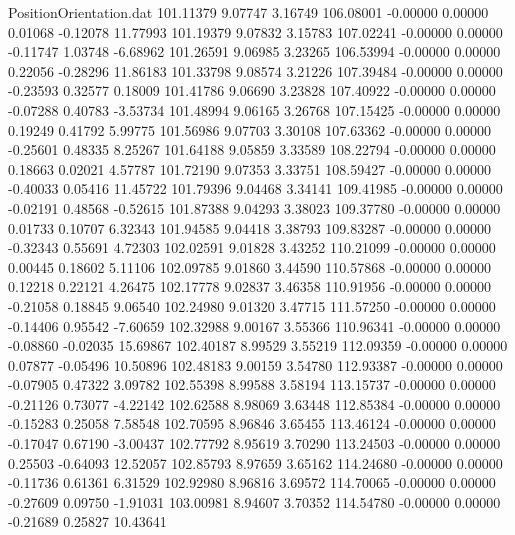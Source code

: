 \begin{filecontents}{PositionOrientation.dat}
 101.11379    9.07747    3.16749   106.08001   -0.00000    0.00000    0.01068   -0.12078   11.77993
 101.19379    9.07832    3.15783   107.02241   -0.00000    0.00000   -0.11747    1.03748   -6.68962
 101.26591    9.06985    3.23265   106.53994   -0.00000    0.00000    0.22056   -0.28296   11.86183
 101.33798    9.08574    3.21226   107.39484   -0.00000    0.00000   -0.23593    0.32577    0.18009
 101.41786    9.06690    3.23828   107.40922   -0.00000    0.00000   -0.07288    0.40783   -3.53734
 101.48994    9.06165    3.26768   107.15425   -0.00000    0.00000    0.19249    0.41792    5.99775
 101.56986    9.07703    3.30108   107.63362   -0.00000    0.00000   -0.25601    0.48335    8.25267
 101.64188    9.05859    3.33589   108.22794   -0.00000    0.00000    0.18663    0.02021    4.57787
 101.72190    9.07353    3.33751   108.59427   -0.00000    0.00000   -0.40033    0.05416   11.45722
 101.79396    9.04468    3.34141   109.41985   -0.00000    0.00000   -0.02191    0.48568   -0.52615
 101.87388    9.04293    3.38023   109.37780   -0.00000    0.00000    0.01733    0.10707    6.32343
 101.94585    9.04418    3.38793   109.83287   -0.00000    0.00000   -0.32343    0.55691    4.72303
 102.02591    9.01828    3.43252   110.21099   -0.00000    0.00000    0.00445    0.18602    5.11106
 102.09785    9.01860    3.44590   110.57868   -0.00000    0.00000    0.12218    0.22121    4.26475
 102.17778    9.02837    3.46358   110.91956   -0.00000    0.00000   -0.21058    0.18845    9.06540
 102.24980    9.01320    3.47715   111.57250   -0.00000    0.00000   -0.14406    0.95542   -7.60659
 102.32988    9.00167    3.55366   110.96341   -0.00000    0.00000   -0.08860   -0.02035   15.69867
 102.40187    8.99529    3.55219   112.09359   -0.00000    0.00000    0.07877   -0.05496   10.50896
 102.48183    9.00159    3.54780   112.93387   -0.00000    0.00000   -0.07905    0.47322    3.09782
 102.55398    8.99588    3.58194   113.15737   -0.00000    0.00000   -0.21126    0.73077   -4.22142
 102.62588    8.98069    3.63448   112.85384   -0.00000    0.00000   -0.15283    0.25058    7.58548
 102.70595    8.96846    3.65455   113.46124   -0.00000    0.00000   -0.17047    0.67190   -3.00437
 102.77792    8.95619    3.70290   113.24503   -0.00000    0.00000    0.25503   -0.64093   12.52057
 102.85793    8.97659    3.65162   114.24680   -0.00000    0.00000   -0.11736    0.61361    6.31529
 102.92980    8.96816    3.69572   114.70065   -0.00000    0.00000   -0.27609    0.09750   -1.91031
 103.00981    8.94607    3.70352   114.54780   -0.00000    0.00000   -0.21689    0.25827   10.43641

\end{filecontents}
